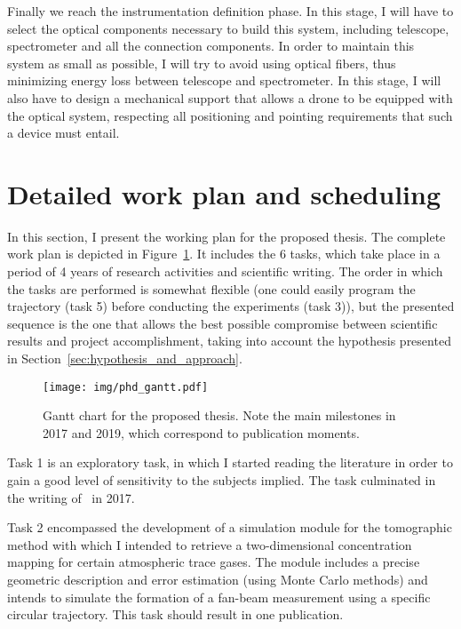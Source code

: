 Finally we reach the instrumentation definition phase. In this stage, I
will have to select the optical components necessary to build this
system, including telescope, spectrometer and all the connection
components. In order to maintain this system as small as possible, I
will try to avoid using optical fibers, thus minimizing energy loss
between telescope and spectrometer. In this stage, I will also have to
design a mechanical support that allows a drone to be equipped with the
optical system, respecting all positioning and pointing requirements
that such a device must entail.

\section{Detailed work plan and scheduling}%
\label{sec:detailed_work_plan_and_scheduling}

In this section, I present the working plan for the proposed thesis. The
complete work plan is depicted in Figure~\ref{fig:low_res_gantt}. It
includes the 6 tasks, which take place in a period of 4 years of
research activities and scientific writing. The order in which the tasks
are performed is somewhat flexible (one could easily program the
trajectory (task 5) before conducting the experiments (task 3)), but the
presented sequence is the one that allows the best possible compromise
between scientific results and project accomplishment, taking into
account the hypothesis presented in
Section~\ref{sec:hypothesis_and_approach}.

\begin{figure}[htpb]
    \centering
    \texttt{[image: img/phd\_gantt.pdf]}
    \caption{Gantt chart for the proposed thesis. Note the main
    milestones in 2017 and 2019, which correspond to publication
    moments.}
    \label{fig:low_res_gantt}
\end{figure}

Task 1 is an exploratory task, in which I started reading the literature
in order to gain a good level of sensitivity to the subjects implied.
The task culminated in the writing of~\cite{ValentedeAlmeida2017} in
2017.

Task 2 encompassed the development of a simulation module for the
tomographic method with which I intended to retrieve a two-dimensional
concentration mapping for certain atmospheric trace gases. The module
includes a precise geometric description and error estimation (using
Monte Carlo methods) and intends to simulate the formation of a fan-beam
measurement using a specific circular trajectory. This task should
result in one publication.

